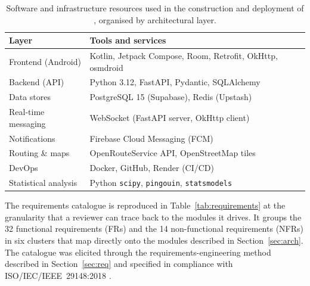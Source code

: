 \documentclass[a4paper,fleqn]{cas-sc}
\begin{document}
	\begin{table}[t]
		\caption{Software and infrastructure resources used in the construction and deployment of \RUTAI{}, organised by architectural layer.}
		\label{tab:materials}
		\centering
		\begin{tabular*}{\tblwidth}{@{}LL@{}}
			\toprule
			Layer & Tools and services \\
			\midrule
			Frontend (Android)   & Kotlin, Jetpack Compose, Room, Retrofit, OkHttp, osmdroid \\
			Backend (API)        & Python 3.12, FastAPI, Pydantic, SQLAlchemy \\
			Data stores          & PostgreSQL 15 (Supabase), Redis (Upstash) \\
			Real-time messaging  & WebSocket (FastAPI server, OkHttp client) \\
			Notifications        & Firebase Cloud Messaging (FCM) \\
			Routing \& maps      & OpenRouteService API, OpenStreetMap tiles \\
			DevOps               & Docker, GitHub, Render (CI/CD) \\
			Statistical analysis & Python \texttt{scipy}, \texttt{pingouin}, \texttt{statsmodels} \\
			\bottomrule
		\end{tabular*}
	\end{table}
	
	The requirements catalogue is reproduced in Table~\ref{tab:requirements} at the granularity that a reviewer can trace back to the modules it drives. It groups the 32 functional requirements (FRs) and the 14 non-functional requirements (NFRs) in six clusters that map directly onto the modules described in Section~\ref{sec:arch}. The catalogue was elicited through the requirements-engineering method described in Section~\ref{sec:req} and specified in compliance with ISO/IEC/IEEE~29148:2018 \citep{iso29148}.
	
\end{document}
